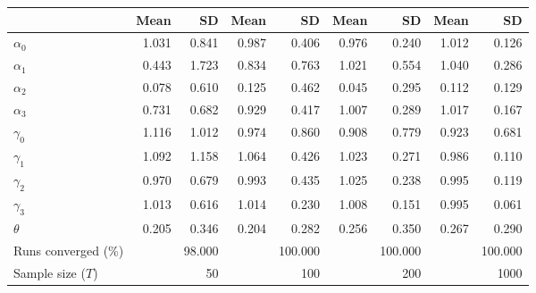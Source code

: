 
\begin{tabular}[t]{lrrrrrrrr}
\toprule
  & Mean & SD & Mean  & SD  & Mean   & SD   & Mean    & SD   \\
\midrule
$\alpha_{0}$ & 1.031 & 0.841 & 0.987 & 0.406 & 0.976 & 0.240 & 1.012 & 0.126\\
$\alpha_{1}$ & 0.443 & 1.723 & 0.834 & 0.763 & 1.021 & 0.554 & 1.040 & 0.286\\
$\alpha_{2}$ & 0.078 & 0.610 & 0.125 & 0.462 & 0.045 & 0.295 & 0.112 & 0.129\\
$\alpha_{3}$ & 0.731 & 0.682 & 0.929 & 0.417 & 1.007 & 0.289 & 1.017 & 0.167\\
$\gamma_{0}$ & 1.116 & 1.012 & 0.974 & 0.860 & 0.908 & 0.779 & 0.923 & 0.681\\
$\gamma_{1}$ & 1.092 & 1.158 & 1.064 & 0.426 & 1.023 & 0.271 & 0.986 & 0.110\\
$\gamma_{2}$ & 0.970 & 0.679 & 0.993 & 0.435 & 1.025 & 0.238 & 0.995 & 0.119\\
$\gamma_{3}$ & 1.013 & 0.616 & 1.014 & 0.230 & 1.008 & 0.151 & 0.995 & 0.061\\
$\theta$ & 0.205 & 0.346 & 0.204 & 0.282 & 0.256 & 0.350 & 0.267 & 0.290\\
Runs converged (\%) &  & 98.000 &  & 100.000 &  & 100.000 &  & 100.000\\
Sample size ($T$) &  & 50 &  & 100 &  & 200 &  & 1000\\
\bottomrule
\end{tabular}

